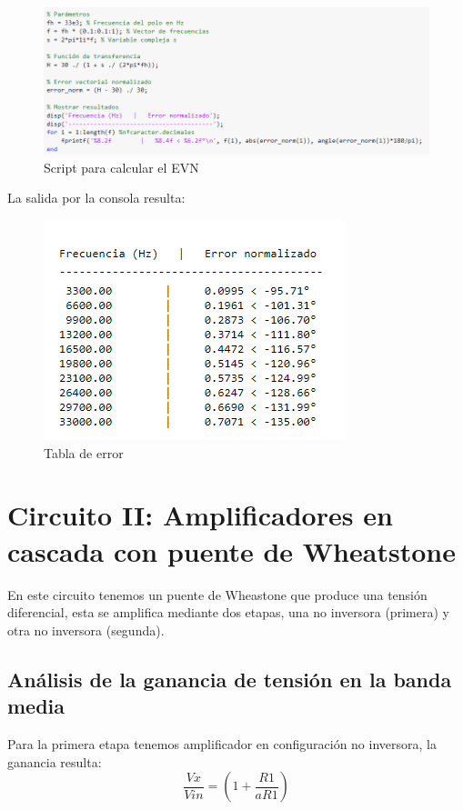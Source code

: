 \documentclass[12pt]{article}
\begin{document}
	\begin{figure}[h!]
		\includegraphics[width=1\linewidth]{Imagenes_simulaciones/error_vectorial_norm}
		\caption[Script para calcular el EVN]{Script para calcular el EVN}
		\label{fig:errorvectorialnorm}
		
	\end{figure}
	La salida por la consola resulta:
	\begin{figure}[h!]
		\includegraphics[width=0.5\linewidth]{Imagenes_simulaciones/error_vectorial_norm_tabla}
		\caption[Tabla de error]{Tabla de error}
		\label{fig:errorvectorialnormtabla}
	\end{figure}
	
	
	\section{Circuito II: Amplificadores en cascada con puente de  Wheatstone }
	En este circuito tenemos un puente de Wheastone que produce una tensión diferencial, esta se amplifica mediante dos etapas, una no inversora (primera) y otra no inversora (segunda).
	
	\subsection{Análisis de la ganancia de tensión en la banda media}
	Para la primera etapa tenemos amplificador en configuración no inversora, la ganancia resulta:
	\begin{equation}
		\frac{Vx}{Vin}=(1+\frac{R1}{aR1})
	\end{equation}
	
\end{document}
